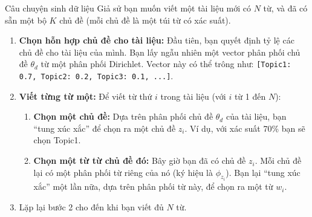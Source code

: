 \begin{deepdive}{Câu chuyện sinh dữ liệu}
Giả sử bạn muốn viết một tài liệu mới có $N$ từ, và đã có sẵn một bộ $K$ chủ đề (mỗi chủ đề là một túi từ có xác suất).
\begin{enumerate}
    \item \textbf{Chọn hỗn hợp chủ đề cho tài liệu:} Đầu tiên, bạn quyết định tỷ lệ các chủ đề cho tài liệu của mình. Bạn lấy ngẫu nhiên một vector phân phối chủ đề $\theta_d$ từ một phân phối Dirichlet. Vector này có thể trông như: \texttt{[Topic1: 0.7, Topic2: 0.2, Topic3: 0.1, ...]}.
    \item \textbf{Viết từng từ một:} Để viết từ thứ $i$ trong tài liệu (với $i$ từ 1 đến $N$):
        \begin{enumerate}
            \item \textbf{Chọn một chủ đề:} Dựa trên phân phối chủ đề $\theta_d$ của tài liệu, bạn “tung xúc xắc” để chọn ra một chủ đề $z_i$. Ví dụ, với xác suất 70\% bạn sẽ chọn Topic1.
            \item \textbf{Chọn một từ từ chủ đề đó:} Bây giờ bạn đã có chủ đề $z_i$. Mỗi chủ đề lại có một phân phối từ riêng của nó (ký hiệu là $\phi_{z_i}$). Bạn lại “tung xúc xắc” một lần nữa, dựa trên phân phối từ này, để chọn ra một từ $w_i$.
        \end{enumerate}
    \item Lặp lại bước 2 cho đến khi bạn viết đủ $N$ từ.
\end{enumerate}
\end{deepdive}

\begin{center}
    \label{fig:lda_generative_process}
\end{center}

